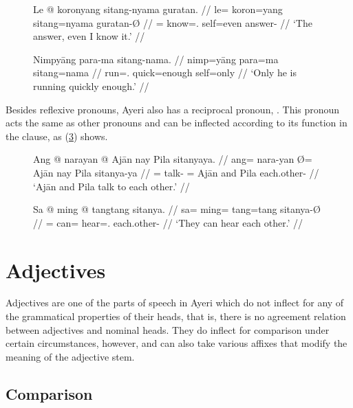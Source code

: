 \begin{figure}
\ex\label{ex:sitangnotop}%
\begingl
	\gla Le @ koronyang sitang-nyama guratan. //
	\glb le= koron=yang sitang=nyama guratan-Ø //
	\glc \PatTI{}= know=\Fsg{}.\Aarg{} self=even answer-\Top{} //
	\glft `The answer, even I know it.' //
\endgl\xe
\end{figure}

\begin{figure}
\ex\label{ex:sitangqtorder}%
\begingl
	\gla Nimpyāng para-ma sitang-nama. //
	\glb nimp=yāng para=ma sitang=nama //
	\glc run=\TsgM{}.\Aarg{} quick=enough self=only //
	\glft `Only he is running quickly enough.' //
\endgl\xe
\end{figure}


Besides reflexive pronouns, Ayeri also has a reciprocal pronoun,
. This pronoun acts the same as other pronouns
and can be inflected according to its function in the clause, as
(\ref{ex:recippro}) shows.

\begin{figure}
\pex\label{ex:recippro}
\a\begingl
	\gla Ang @ narayan {} @ Ajān nay Pila sitanyaya. //
	\glb ang= nara-yan Ø= Ajān nay Pila sitanya-ya //
	\glc \AgtT{}= talk-\TplM{} \Top{}= Ajān and Pila each.other-\Loc{} //
	\glft `Ajān and Pila talk to each other.' //
\endgl

\a\begingl
	\gla Sa @ ming @ tangtang sitanya. //
	\glb sa= ming= tang=tang sitanya-Ø //
	\glc \PatT{}= can= hear=\TplM{}.\Aarg{} each.other-\Top{} //
	\glft `They can hear each other.' //
\endgl
\xe
\end{figure}


\section{Adjectives}
\label{sec:adjectives}

Adjectives are one of the parts of speech in Ayeri which do not inflect for any
of the grammatical properties of their heads, that is, there is no agreement
relation between adjectives and nominal heads. They do inflect for comparison
under certain circumstances, however, and can also take various affixes that
modify the meaning of the adjective stem.

\subsection{Comparison}
\label{subsec:adjcomp}


